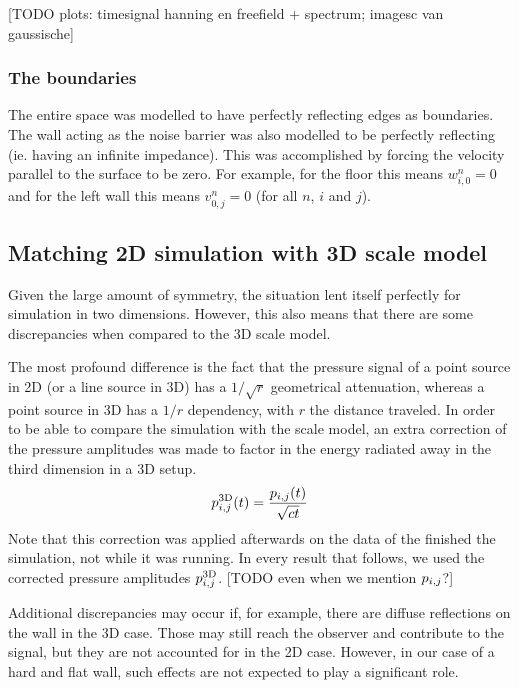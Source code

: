 [TODO plots: timesignal hanning en freefield + spectrum; imagesc van gaussische]


\subsubsection*{The boundaries}
The entire space was modelled to have perfectly reflecting edges as boundaries. The wall acting as the noise barrier was also modelled to be perfectly reflecting (ie. having an infinite impedance). This was accomplished by forcing the velocity parallel to the surface to be zero. For example, for the floor this means $w_{i,0}^n = 0$ and for the left wall this means $v_{0,j}^n = 0$ (for all $n$, $i$ and $j$).



\subsection{Matching 2D simulation with 3D scale model}
Given the large amount of symmetry, the situation lent itself perfectly for simulation in two dimensions. However, this also means that there are some discrepancies when compared to the 3D scale model.

The most profound difference is the fact that the pressure signal of a point source in 2D (or a line source in 3D) has a $1/\sqrt{r}$ geometrical attenuation, whereas a point source in 3D has a $1/r$ dependency, with $r$ the distance traveled. In order to be able to compare the simulation with the scale model, an extra correction of the pressure amplitudes was made to factor in the energy radiated away in the third dimension in a 3D setup.
$$
p_{i,j}^{\mathrm{3D}}(t) = \frac{p_{i,j}(t)}{\sqrt{ct}}
$$
Note that this correction was applied afterwards on the data of the finished the simulation, not while it was running. In every result that follows, we used the corrected pressure amplitudes $p_{i,j}^{\mathrm{3D}}$. [TODO even when we mention $p_{i,j}$?]

Additional discrepancies may occur if, for example, there are diffuse reflections on the wall in the 3D case. Those may still reach the observer and contribute to the signal, but they are not accounted for in the 2D case. However, in our case of a hard and flat wall, such effects are not expected to play a significant role.

